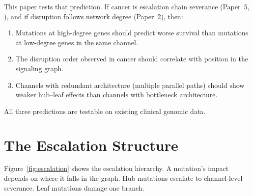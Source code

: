 \documentclass[11pt]{article}
\begin{document}
This paper tests that prediction. If cancer is escalation chain
severance (Paper~5, \cite{McCarthy2026e}), and if disruption
follows network degree (Paper~2), then:

\begin{enumerate}
\item Mutations at high-degree genes should predict worse survival
than mutations at low-degree genes in the same channel.
\item The disruption order observed in cancer should correlate
with position in the signaling graph.
\item Channels with redundant architecture (multiple parallel
paths) should show weaker hub--leaf effects than channels with
bottleneck architecture.
\end{enumerate}

All three predictions are testable on existing clinical genomic data.

\section{The Escalation Structure}
\label{sec:escalation}

Figure~\ref{fig:escalation} shows the escalation hierarchy.
A mutation's impact depends on where it falls in the graph.
Hub mutations escalate to channel-level severance. Leaf mutations
damage one branch.
\end{document}
